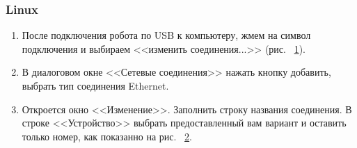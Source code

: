 \documentclass[12pt,a4paper,openany]{extarticle}
\begin{document}
\subsubsection{Linux}

\begin{enumerate}
\item После подключения робота по USB к компьютеру, жмем на символ подключения и выбираем <<изменить соединения...>>  (рис. ~\ref{network_window}).
    
\begin{figure}[h!]
	\noindent{}
	\caption{}
	\label{network_window}
\end{figure}

\item В диалоговом окне <<Сетевые соединения>> нажать кнопку добавить, выбрать тип соединения Ethernet.

\item Откроется окно <<Изменение>>. Заполнить строку названия соединения. В строке <<Устройство>> выбрать предоставленный вам вариант и оставить только номер, как показанно на рис. ~\ref{editing_ev3_1}. 

\begin{figure}[h!]
	\noindent{}
	\caption{}
	\label{editing_ev3_1}
\end{figure}


\end{enumerate}
\end{document}
